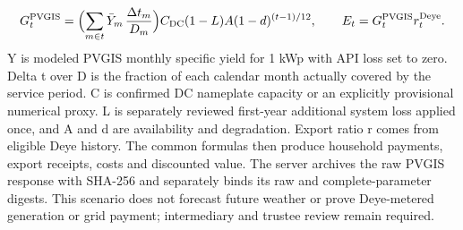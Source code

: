\documentclass[12pt,a4paper]{article}
\begin{document}
\[G_t^{\mathrm{PVGIS}}=\Bigl(\sum_{m\in t}\bar Y_m\,\frac{\Delta t_m}{D_m}\Bigr)C_{\rm DC}(1-L)A(1-d)^{(t-1)/12},\qquad E_t=G_t^{\mathrm{PVGIS}}r_t^{\rm Deye}.\]
Y is modeled PVGIS monthly specific yield for 1 kWp with API loss set to zero. Delta t over D is the fraction of each calendar month actually covered by the service period. C is confirmed DC nameplate capacity or an explicitly provisional numerical proxy. L is separately reviewed first-year additional system loss applied once, and A and d are availability and degradation. Export ratio r comes from eligible Deye history. The common formulas then produce household payments, export receipts, costs and discounted value. The server archives the raw PVGIS response with SHA-256 and separately binds its raw and complete-parameter digests. This scenario does not forecast future weather or prove Deye-metered generation or grid payment; intermediary and trustee review remain required.
\end{document}
